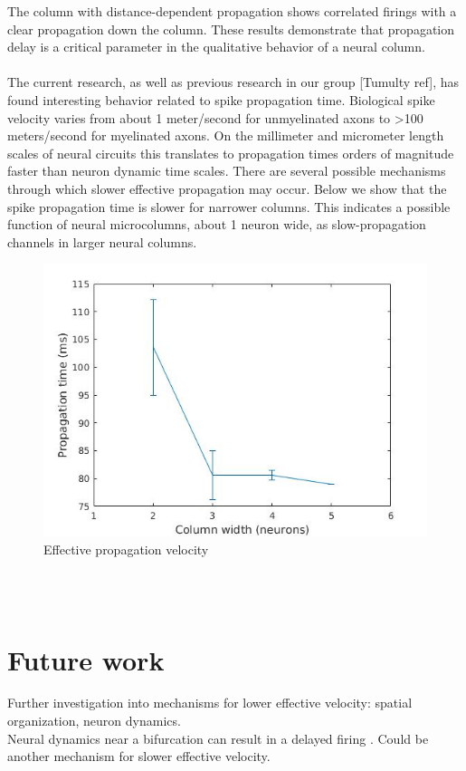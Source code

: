 \documentclass[a4paper,11pt]{article}
\begin{document}
The column with distance-dependent propagation shows correlated firings with a clear propagation down the column.
These results demonstrate that propagation delay is a critical parameter in the qualitative behavior of a neural column.
\\ \\
The current research, as well as previous research in our group [Tumulty ref], has found interesting behavior related to spike propagation time.
Biological spike velocity varies from about 1 meter/second for unmyelinated axons to >100 meters/second for myelinated axons.
On the millimeter and micrometer length scales of neural circuits this translates to propagation times orders of magnitude faster than neuron dynamic time scales.
There are several possible mechanisms through which slower effective propagation may occur.
Below we show that the spike propagation time is slower for narrower columns. 
This indicates a possible function of neural microcolumns, about 1 neuron wide, as slow-propagation channels in larger neural columns.
\\
\begin{figure}[ht]
 \caption{Effective propagation velocity}
 \centering
   \includegraphics[width=\textwidth]{fig/propagation_time}
\end{figure}
\\ \\

\section{Future work}
Further investigation into mechanisms for lower effective velocity: spatial organization, neuron dynamics.\\
Neural dynamics near a bifurcation can result in a delayed firing \cite{izhikevich}.
Could be another mechanism for slower effective velocity.

\printbibliography
\end{document}
